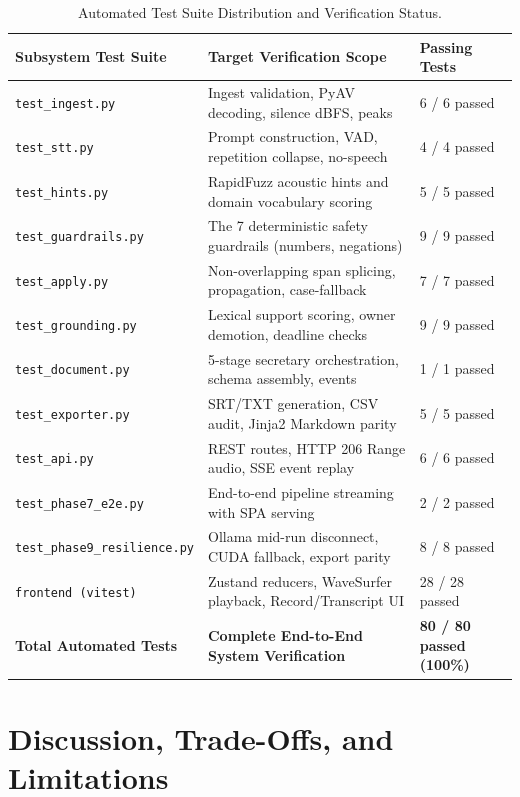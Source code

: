 \documentclass[10pt,a4paper]{article}
\begin{document}
\begin{table}[h]
\centering
\caption{Automated Test Suite Distribution and Verification Status.}
\label{tab:test_suite}
\small
\begin{tabularx}{\columnwidth}{l X l}
\toprule
\textbf{Subsystem Test Suite} & \textbf{Target Verification Scope} & \textbf{Passing Tests} \\
\midrule
\texttt{test\_ingest.py} & Ingest validation, PyAV decoding, silence dBFS, peaks & 6 / 6 passed \\
\texttt{test\_stt.py} & Prompt construction, VAD, repetition collapse, no-speech & 4 / 4 passed \\
\texttt{test\_hints.py} & RapidFuzz acoustic hints and domain vocabulary scoring & 5 / 5 passed \\
\texttt{test\_guardrails.py} & The 7 deterministic safety guardrails (numbers, negations) & 9 / 9 passed \\
\texttt{test\_apply.py} & Non-overlapping span splicing, propagation, case-fallback & 7 / 7 passed \\
\texttt{test\_grounding.py} & Lexical support scoring, owner demotion, deadline checks & 9 / 9 passed \\
\texttt{test\_document.py} & 5-stage secretary orchestration, schema assembly, events & 1 / 1 passed \\
\texttt{test\_exporter.py} & SRT/TXT generation, CSV audit, Jinja2 Markdown parity & 5 / 5 passed \\
\texttt{test\_api.py} & REST routes, HTTP 206 Range audio, SSE event replay & 6 / 6 passed \\
\texttt{test\_phase7\_e2e.py} & End-to-end pipeline streaming with SPA serving & 2 / 2 passed \\
\texttt{test\_phase9\_resilience.py} & Ollama mid-run disconnect, CUDA fallback, export parity & 8 / 8 passed \\
\texttt{frontend (vitest)} & Zustand reducers, WaveSurfer playback, Record/Transcript UI & 28 / 28 passed \\
\midrule
\textbf{Total Automated Tests} & \textbf{Complete End-to-End System Verification} & \textbf{80 / 80 passed (100\%)} \\
\bottomrule
\end{tabularx}
\end{table}

\section{Discussion, Trade-Offs, and Limitations}
\label{sec:discussion}
\end{document}
